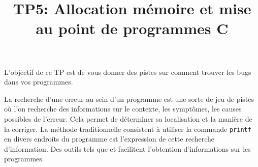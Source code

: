 \documentclass[10pt]{article}\usepackage[nu]{esial}
\begin{document}
\title{TP5: Allocation mémoire et mise au point de programmes C}
\maketitle

\newcommand{\I}{\hspace{1.5em}}


L'objectif de ce TP est de vous donner des pistes sur comment trouver les bugs
dans vos programmes.

La recherche d'une erreur au sein d'un programme est une sorte de jeu de pistes
où l'on recherche des informations sur le contexte, les symptômes, les causes
possibles de l'erreur. Cela permet de déterminer sa localisation et la manière
de la corriger.  La méthode traditionnelle consistent à utiliser la commande
\texttt{printf} en divers endroits du programme est l'expression de cette
recherche d'information. Des outils tels que  et 
facilitent l'obtention d'informations sur les programmes.
\end{document}
